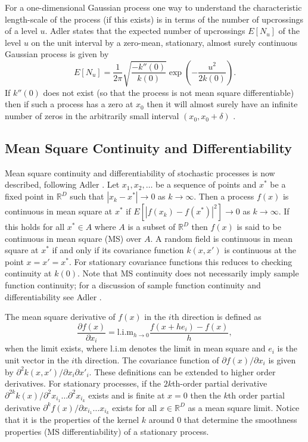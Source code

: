 \documentclass[11pt]{book}
\begin{document}
For a one-dimensional Gaussian process one way to understand the characteristic length-scale of the process (if this exists) is in terms of the number of upcrossings of a level $u$. Adler \cite{adler1981} states that the expected number of upcrossings $E[N_u]$ of the level $u$ on the unit interval by a zero-mean, stationary, almost surely continuous Gaussian process is given by
\begin{equation}
\label{eq:upcrossings}
E[N_u] = \frac{1}{2\pi} \sqrt{\frac{-k''(0)}{k(0)}} \exp\left(-\frac{u^2}{2k(0)}\right).
\end{equation}
If $k''(0)$ does not exist (so that the process is not mean square differentiable) then if such a process has a zero at $x_0$ then it will almost surely have an infinite number of zeros in the arbitrarily small interval $(x_0, x_0 + \delta)$ \cite{blake1973}.

\subsection{Mean Square Continuity and Differentiability}
\label{sec:ms_continuity}

Mean square continuity and differentiability of stochastic processes is now described, following Adler \cite{adler1981}. Let $x_1, x_2, \ldots$ be a sequence of points and $x^*$ be a fixed point in $\mathbb{R}^D$ such that $|x_k - x^*| \to 0$ as $k \to \infty$. Then a process $f(x)$ is continuous in mean square at $x^*$ if $E[|f(x_k) - f(x^*)|^2] \to 0$ as $k \to \infty$. If this holds for all $x^* \in A$ where $A$ is a subset of $\mathbb{R}^D$ then $f(x)$ is said to be continuous in mean square (MS) over $A$. A random field is continuous in mean square at $x^*$ if and only if its covariance function $k(x, x')$ is continuous at the point $x = x' = x^*$. For stationary covariance functions this reduces to checking continuity at $k(0)$. Note that MS continuity does not necessarily imply sample function continuity; for a discussion of sample function continuity and differentiability see Adler \cite{adler1981}.

The mean square derivative of $f(x)$ in the $i$th direction is defined as
\begin{equation}
\label{eq:ms_derivative}
\frac{\partial f(x)}{\partial x_i} = \text{l.i.m}_{h \to 0} \frac{f(x + h e_i) - f(x)}{h},
\end{equation}
when the limit exists, where l.i.m denotes the limit in mean square and $e_i$ is the unit vector in the $i$th direction. The covariance function of $\partial f(x)/\partial x_i$ is given by $\partial^2 k(x, x')/\partial x_i \partial x'_i$. These definitions can be extended to higher order derivatives. For stationary processes, if the $2k$th-order partial derivative $\partial^{2k} k(x)/\partial^2 x_{i_1} \ldots \partial^2 x_{i_k}$ exists and is finite at $x = 0$ then the $k$th order partial derivative $\partial^k f(x)/\partial x_{i_1} \ldots x_{i_k}$ exists for all $x \in \mathbb{R}^D$ as a mean square limit. Notice that it is the properties of the kernel $k$ around $0$ that determine the smoothness properties (MS differentiability) of a stationary process.
\end{document}
